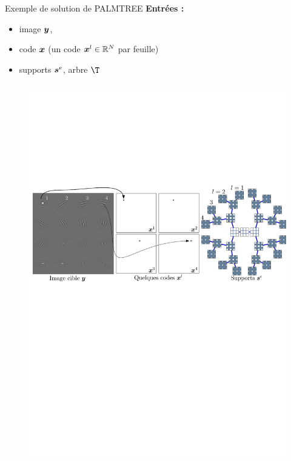 \begin{frame}{Exemple de solution de PALMTREE}
\textbf{Entrées :} \begin{itemize}
	\item image $\bm{y}$,
	\item code $\bm{x}$ (un code $\bm{x}^l \in \mathbb{R}^N$ par feuille)
	\item supports $\bm{s}^e$, arbre $\T$
\end{itemize}
\begin{columns}
\begin{column}{1\textwidth} \begin{figure}\centering
	\includegraphics[width=\textwidth]{figures/tree-learn-setup/inputs.pdf}
\end{figure}\end{column}
\end{columns}
\end{frame}


